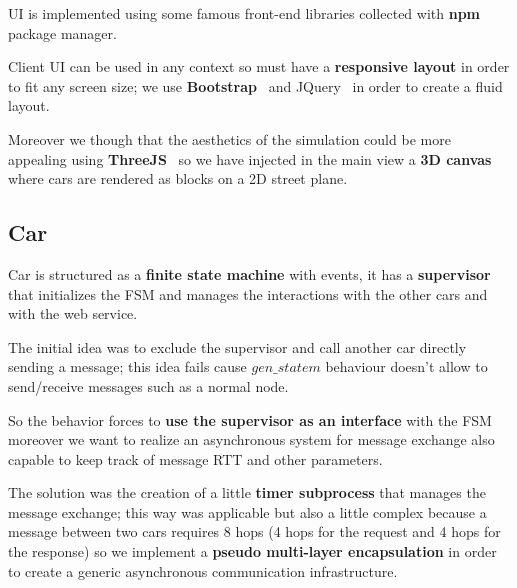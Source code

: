 UI is implemented using some famous front-end libraries collected with 
\textbf{npm}~\cite{16} package manager. 

Client UI can be used in any context so must have a \textbf{responsive layout} in order 
to fit any screen size; we use \textbf{Bootstrap}~\cite{19} and JQuery~\cite{20} 
in order to create a fluid layout. 

Moreover we though that the aesthetics of the simulation could be more appealing 
using \textbf{ThreeJS}~\cite{21} so we have injected in the main view a \textbf{3D canvas} 
where cars are rendered as blocks on a 2D street plane.


\subsection{Car}

Car is structured as a \textbf{finite state machine} with events, 
it has a \textbf{supervisor} that initializes the FSM and manages the interactions 
with the other cars and with the web service. 

The initial idea was to exclude the supervisor and call another car directly sending 
a message; this idea fails cause $gen\_statem$ behaviour doesn't allow to send/receive 
messages such as a normal node. 

So the behavior forces to \textbf{use the supervisor as an interface} with the FSM 
moreover we want to realize an asynchronous system for message exchange also 
capable to keep track of message RTT and other parameters. 

The solution was the creation of a little \textbf{timer subprocess} that manages the 
message exchange; this way was applicable but also a little complex because 
a message between two cars requires 8 hops (4 hops for the request and 4 hops for 
the response) so we implement a \textbf{pseudo multi-layer encapsulation} in order 
to create a generic asynchronous communication infrastructure.    

